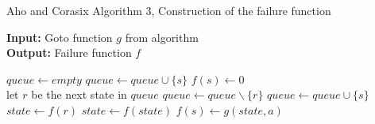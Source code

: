 \documentclass[english,twoside,censored,csm,algorithms-track-2020]{HYthesisML}
\theoremstyle{plain}
\theoremstyle{definition}
\begin{document}
  \begin{algorithm}

    \caption{Aho and Corasix Algorithm 3, Construction of the failure function} \label{ac-fail}
    \hspace*{\algorithmicindent} \textbf{Input:} Goto function $g$ from algorithm\\ %
    \hspace*{\algorithmicindent} \textbf{Output:} Failure function $f$

    \begin{algorithmic}[1]
        \State $queue\gets \textit{empty}$
          \State $queue\gets queue \cup \{s\}$
          \State $f(s)\gets 0$
        \EndFor
        \\
          \hspace*{\algorithmicindent}let $r$ be the next state in $queue$
          \State $queue\gets queue \backslash \{r\}$
            \State $queue\gets queue \cup \{s\}$
            \State $state\gets f(r)$
              \State $state\gets f(state)$
            \EndWhile
            \State $f(s)\gets g(state,a)$              
          \EndFor
        \EndWhile
          
      \EndFunction

    \end{algorithmic}
  \end{algorithm}
\end{document}
